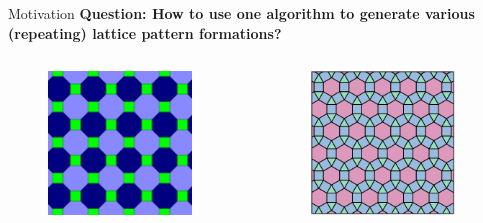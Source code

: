 \documentclass[10pt]{beamer}
\begin{document}
\begin{frame}{Motivation}{}
  \textbf{Question: How to use one algorithm to generate
      various (repeating) lattice pattern formations?}
    \begin{columns}
    \begin{column}{.45\textwidth}
      \begin{figure}
        \centering
        \includegraphics[height=1.5in]{figs/tessellation2}
      \end{figure}
    \end{column}
    \begin{column}{.45\textwidth}
       \begin{figure}
         \centering
        \includegraphics[height=1.5in]{figs/tessellation1}
      \end{figure}
    \end{column}
  \end{columns} 
\end{frame}
\end{document}
